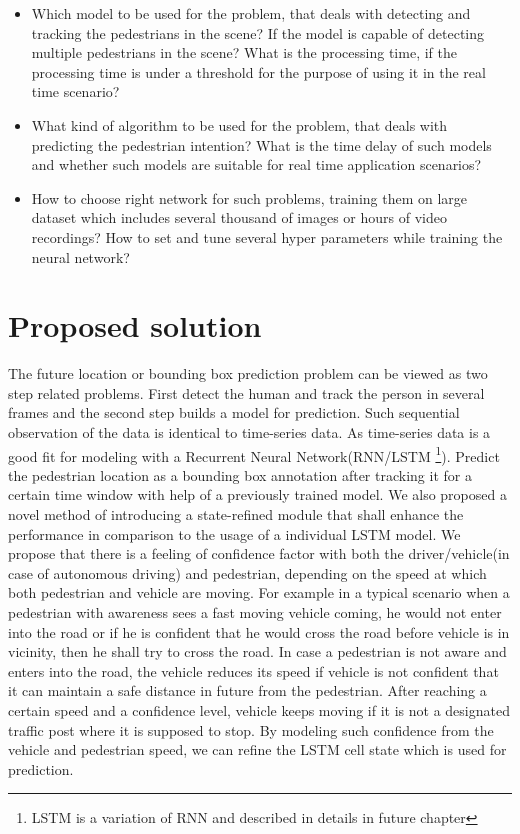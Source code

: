 \begin{itemize}
	\item Which model to be used for the problem, that deals with detecting and tracking the pedestrians in the scene? If the model is capable of detecting multiple pedestrians in the scene? What is the processing time, if the processing time is under a threshold for the purpose of using it in the real time scenario?

	\item 
What kind of algorithm to be used for the problem, that deals with predicting the pedestrian intention? What is the time delay of such models and whether such models are suitable for real time application scenarios?

	\item How to choose right network for such problems, training them on large dataset which includes several thousand of images or hours of video recordings? How to set and tune several hyper parameters while training the neural network? 

\end{itemize}


\section{Proposed solution}
The future location or bounding box prediction problem can be viewed as two step related problems. First detect the human and track the person in several frames and the second step builds a model for prediction. Such sequential observation of the data is identical to time-series data. As time-series data is a good fit for modeling with a Recurrent Neural Network(RNN/LSTM \footnote{LSTM is a variation of RNN and described in details in future chapter}). Predict the pedestrian location as a bounding box annotation after tracking it for a certain time window with help of a previously trained model. 
\newpara
We also proposed a novel method of introducing a state-refined module that shall enhance the performance in comparison to the usage of a individual LSTM model. 
We propose that there is a feeling of confidence factor with both the driver/vehicle(in case of autonomous driving) and pedestrian, depending on the speed at which both pedestrian and vehicle are moving. For example in a typical scenario when a pedestrian with awareness sees a fast moving vehicle coming, he would not enter into the road or if he is confident that he would cross the road before vehicle is in vicinity, then he shall try to cross the road. In case a pedestrian is not aware and enters into the road, the vehicle reduces its speed if vehicle is not confident that it can maintain a safe distance in future from the pedestrian. After reaching a certain speed and a confidence level, vehicle keeps moving if it is not a designated traffic post where it is supposed to stop. By modeling such confidence from the vehicle and pedestrian speed, we can refine the LSTM cell state which is used for prediction.

